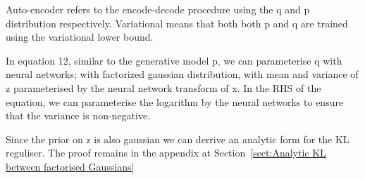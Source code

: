\documentclass[11pt]{article}
\begin{document}
\begin{figure}[H]
    \centering
\end{figure}

Auto-encoder refers to the encode-decode procedure using the q and p distribution respectively. Variational means that both both p and q are trained using the variational lower bound. 

In equation 12, similar to the generative model p, we can parameterise q with neural networks; with factorized gaussian distribution, with mean and variance of z parameterised by the neural network transform of x. In the RHS of the equation, we can parameterise the logarithm by the neural networks to ensure that the variance is non-negative.

Since the prior on z is also gaussian we can derrive an analytic form for the KL reguliser. The proof remains in the appendix at Section~\ref{sect:Analytic KL between factorised Gaussians}
\end{document}
